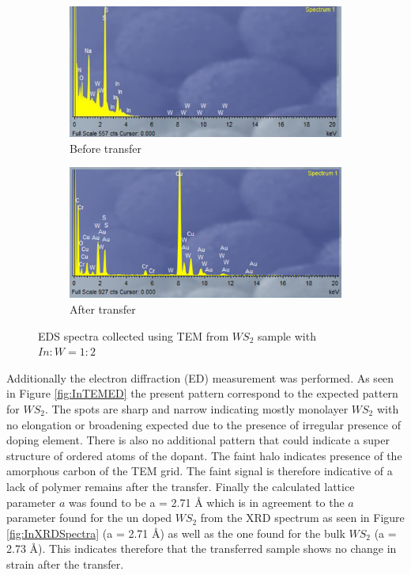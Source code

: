 \begin{figure}[H]
	\begin{center}
			\begin{subfigure}[b]{0.6\textwidth}
			\includegraphics[width=\textwidth]{In/TEMEDSFra.png}
			\caption{Before transfer}
			\label{fig:InTEMEDSFra}
		\end{subfigure}
		\qquad
		\begin{subfigure}[b]{0.6\textwidth}
			\includegraphics[width=\textwidth]{In/TEMEDS.png}
			\caption{After transfer}
			\label{fig:InTEMEDS}
		\end{subfigure}
		\caption{EDS spectra collected using TEM from $WS_2$ sample with $In:W = 1:2$}
		\label{fig:InTEMEDSSpectra}
	\end{center}
\end{figure}

Additionally the electron diffraction (ED) measurement was performed. As seen in Figure \ref{fig:InTEMED} the present pattern correspond to the expected pattern for $WS_2$. The spots are sharp and narrow indicating mostly monolayer $WS_2$ with no elongation or broadening expected due to the presence of irregular presence of doping element. There is also no additional pattern that could indicate a super structure of ordered atoms of the dopant. The faint halo indicates presence of the amorphous carbon of the TEM grid. The faint signal is therefore indicative of a lack of polymer remains after the transfer. Finally the calculated lattice parameter $a$ was found to be a = 2.71 \r{A} which is in agreement to the $a$ parameter found for the un doped $WS_2$ from the XRD spectrum as seen in Figure \ref{fig:InXRDSpectra} (a = 2.71 \r{A}) as well as the  one found for the bulk $WS_2$ (a = 2.73 \r{A}). This indicates therefore that the transferred sample shows no change in strain after the transfer.

